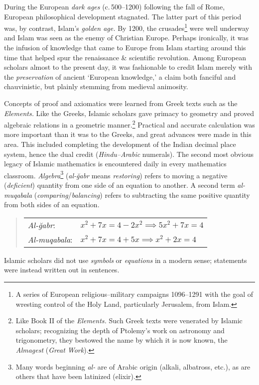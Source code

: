 During the European \emph{dark ages} (c.\,500--1200) following the fall of Rome, European philosophical development stagnated. The latter part of this period was, by contrast, Islam's \emph{golden age.} By 1200, the crusades\footnote{A series of European religious--military campaigns 1096--1291 with the goal of wresting control of the Holy Land, particularly Jerusalem, from Islam.} were well underway and Islam was seen as the enemy of Christian Europe. Perhaps ironically, it was the infusion of knowledge that came to Europe from Islam starting around this time that helped spur the renaissance \& scientific revolution. Among European scholars almost to the present day, it was fashionable to credit Islam merely with the \emph{preservation} of ancient `European knowledge,' a claim both fanciful and chauvinistic, but plainly stemming from medieval animosity.

\goodbreak



Concepts of proof and axiomatics were learned from Greek texts such as the \emph{Elements.} Like the Greeks, Islamic scholars gave primacy to geometry and proved algebraic relations in a geometric manner.\footnote{Like Book II of the \emph{Elements.} 
Such Greek texts were venerated by Islamic scholars; recognizing the depth of Ptolemy's work on astronomy and trigonometry, they bestowed the name by which it is now known, the \emph{Almagest} (\emph{Great Work}).} Practical and accurate calculation was more important than it was to the Greeks, and great advances were made in this area. This included completing the development of the Indian decimal place system, hence the dual credit (\emph{Hindu--Arabic} numerals).\smallbreak
The second most obvious legacy of Islamic mathematics is encountered daily in every mathematics classroom. \emph{Algebra}\footnote{Many words beginning \emph{al-} are of Arabic origin (alkali, albatross, etc.), as are others that have been latinized (elixir).} (\emph{al-ğabr} means \emph{restoring}) refers to moving a negative (\emph{deficient}) quantity from one side of an equation to another. A second term \emph{al-muqabala} (\emph{comparing}/\emph{balancing}) refers to subtracting the same positive quantity from both sides of an equation.
\begin{quote}
\begin{tabular}{l@{\quad}l}
\emph{Al-ğabr}:&$x^2+7x=4-2x^2\implies 5x^2+7x=4$\\[4pt]
\emph{Al-muqabala}:&$x^2+7x=4+5x\implies x^2+2x=4$
\end{tabular}
\end{quote}
Islamic scholars did not use \emph{symbols} or \emph{equations} in a modern sense; statements were instead written out in sentences.


